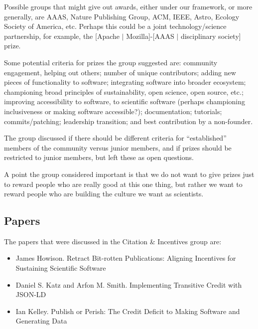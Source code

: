 \documentclass[11pt, oneside]{amsart}
\begin{document}
Possible groups that might give out awards, either under our framework, or more
generally, are AAAS, Nature Publishing Group, ACM, IEEE, Astro, Ecology Society
of America, etc. Perhaps this could be a joint technology/science partnership,
for example, the [Apache $|$ Mozilla]-[AAAS $|$ disciplinary society] prize.

Some potential criteria for prizes the group suggested are:
community engagement, helping out others;
number of unique contributors;
adding new pieces of functionality to software;
integrating software into broader ecosystem; championing broad principles of
sustainability, open science, open source, etc.;
improving accessibility to software, to scientific software (perhaps championing
inclusiveness or making software accessible?);
documentation;
tutorials;
commits/patching;
leadership transition; and
best contribution by a non-founder.

The group discussed if there should be different criteria for ``established''
members of the community versus junior members, and if prizes should be
restricted to junior members, but left these as open questions.

A point the group considered important is that we do not want to give prizes just
to reward people who are really good at this one thing, but rather we want to
reward people who are building the culture we want as scientists.





\subsection{Papers}
The papers that were discussed in the Citation \& Incentives group are:
\begin{itemize}
\item James Howison. Retract Bit-rotten Publications: Aligning Incentives for
Sustaining Scientific Software~\cite{wssspe2_howison}

\item Daniel S. Katz and Arfon M. Smith. Implementing Transitive Credit with
{JSON-LD}~\cite{wssspe2_katz}

\item Ian Kelley. Publish or Perish: The Credit Deficit to Making Software and
Generating Data~\cite{wssspe2_kelley}
\end{itemize}
\end{document}

